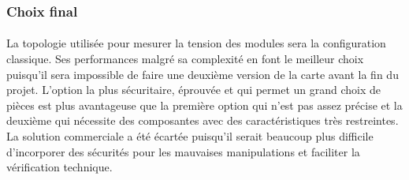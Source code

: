 	\subsubsection*{Choix final}
	\paragraph*{}	
	La topologie utilisée pour mesurer la tension des modules sera la configuration classique. Ses performances malgré sa complexité en font le meilleur choix puisqu'il sera impossible de faire une deuxième version de la carte avant la fin du projet. L'option la plus sécuritaire, éprouvée et qui permet un grand choix de pièces est plus avantageuse que la première option qui n'est pas assez précise et la deuxième qui nécessite des composantes avec des caractéristiques très restreintes. La solution commerciale a été écartée puisqu'il serait beaucoup plus difficile d'incorporer des sécurités pour les mauvaises manipulations et faciliter la vérification technique.	